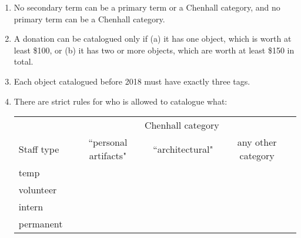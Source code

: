 \documentclass{article}
\newcommand{\cmark}{\ding{51}}
\newcommand{\xmark}{\ding{55}}
\begin{document}
\begin{enumerate}

\item
No secondary term can be a primary term or a Chenhall category,
and no primary term can be a Chenhall category.


\item
A donation can be catalogued only if (a) it has one object, which is worth at least \$100,
or (b) it has two or more objects, which are worth at least \$150 in total.


\item
Each object catalogued before 2018
must have exactly three tags.


\item
There are strict rules for who is allowed to catalogue what: 

\begin{center}
\begin{tabular}{|l|c|c|c|}
\hline
& \multicolumn{3}{|c|}{Chenhall category} \\
\cline{2-4} 
Staff type & ``personal artifacts" & ``architectural" & any other category \\
\hline
temp & \xmark{} & \xmark{} & \xmark{} \\
\hline
volunteer & \cmark{} & \cmark{} & \xmark{} \\
\hline
intern & \cmark{} & \cmark{} & \xmark{} \\
\hline
permanent & \cmark{} & \cmark{} & \cmark{} \\
\hline
\end{tabular}
\end{center}

\end{enumerate}
\end{document}
